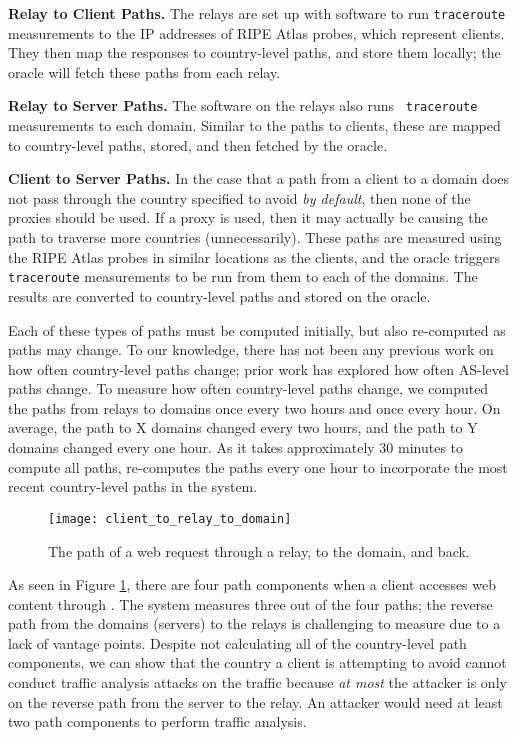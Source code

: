 {\bf Relay to Client Paths.} The relays are set up with software to run 
{\tt traceroute} measurements to the IP addresses of RIPE Atlas probes, which 
represent clients.  They then map the responses to country-level paths, and 
store them locally; the oracle will fetch these paths from each relay. 

{\bf Relay to Server Paths.} The software on the relays also runs {\tt 
traceroute} measurements to each domain.  Similar to the paths to clients, these 
are mapped to country-level paths, stored, and then fetched by the oracle.

{\bf Client to Server Paths.} In the case that a path from a client to a 
domain does not pass through the country specified to avoid {\it by default}, 
then none of the proxies should be used.  If a proxy is used, then it may 
actually be causing the path to traverse more countries (unnecessarily).  These 
paths are measured using the RIPE Atlas probes in similar locations as the 
clients, and the oracle triggers {\tt traceroute} measurements to be run from 
them to each of the domains.  The results are converted to country-level paths 
and stored on the oracle.  

Each of these types of paths must be computed initially, but also re-computed 
as paths may change.  To our knowledge, there has not been any previous work 
on how often country-level paths change; prior work has explored how often 
AS-level paths change.  To measure how often country-level paths change, we 
computed the paths from relays to domains once every two hours and once every 
hour.  On average, the path to X domains changed every two hours, and the path 
to Y domains changed every one hour.  As it takes approximately 30 minutes to 
compute all paths, \system{} re-computes the paths every one hour to incorporate 
the most recent country-level paths in the system.

\begin{figure}[t]
\centering
\texttt{[image: client\_to\_relay\_to\_domain]}
\caption{The path of a web request through a \system{} relay, to the domain, and back.}
\label{fig:path_components}
\end{figure}

As seen in Figure \ref{fig:path_components}, there are four path components 
when a client accesses web content through \system{}.  The system measures three 
out of the four paths; the reverse path from the domains (servers) to the relays 
is challenging to measure due to a lack of vantage points.  Despite not 
calculating all of the country-level path components, we can show that the 
country a client is attempting to avoid cannot conduct traffic analysis attacks 
on the traffic because {\it at most} the attacker is only on the reverse path 
from the server to the relay.  An attacker would need at least two path 
components to perform traffic analysis. 

